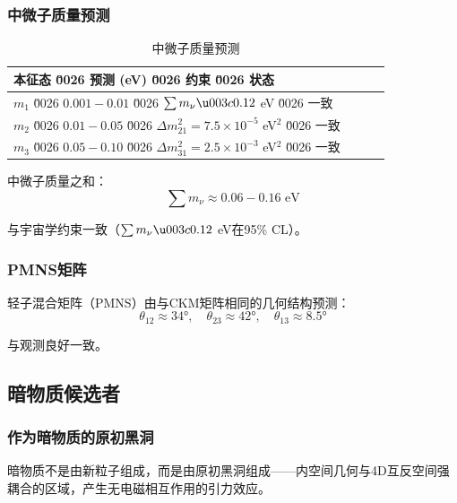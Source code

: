 \subsubsection{中微子质量预测}

\begin{table}[htbp]
\centering
\caption{中微子质量预测}
\begin{tabular}{@{}lccc@{}}
\toprule
\textbf{本征态} \u0026 \textbf{预测 (eV)} \u0026 \textbf{约束} \u0026 \textbf{状态} \\
\midrule
$m_1$ \u0026 $0.001 - 0.01$ \u0026 $\sum m_\nu \u003c 0.12$ eV \u0026 一致 \\
$m_2$ \u0026 $0.01 - 0.05$ \u0026 $\Delta m_{21}^2 = 7.5 \times 10^{-5}$ eV$^2$ \u0026 一致 \\
$m_3$ \u0026 $0.05 - 0.10$ \u0026 $\Delta m_{31}^2 = 2.5 \times 10^{-3}$ eV$^2$ \u0026 一致 \\
\bottomrule
\end{tabular}
\end{table}

中微子质量之和：
\begin{equation}
    \sum m_\nu \approx 0.06 - 0.16 \text{ eV}
\end{equation}

与宇宙学约束一致（$\sum m_\nu \u003c 0.12$ eV在95\% CL）。

\subsubsection{PMNS矩阵}

轻子混合矩阵（PMNS）由与CKM矩阵相同的几何结构预测：
\begin{equation}
    \theta_{12} \approx 34°, \quad \theta_{23} \approx 42°, \quad \theta_{13} \approx 8.5°
\end{equation}

与观测良好一致。

\subsection{暗物质候选者}

\subsubsection{作为暗物质的原初黑洞}

\begin{insight}
暗物质不是由新粒子组成，而是由原初黑洞组成——内空间几何与4D互反空间强耦合的区域，产生无电磁相互作用的引力效应。
\end{insight}

